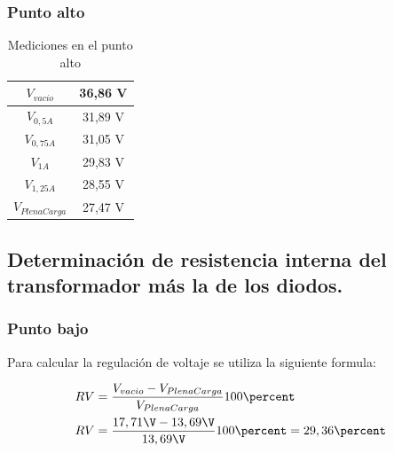 \subsubsection{Punto alto}

\begin{table}[H]
  \centering
  \begin{tabular}{|c|c|}
    \hline
    $V_{vacio}$ & 36,86 V \\ \hline
    $V_{0,5 A}$ & 31,89 V \\ \hline
    $V_{0,75 A}$ & 31,05 V \\ \hline    
    $V_{1 A}$ & 29,83 V \\ \hline
    $V_{1,25 A}$ & 28,55 V \\ \hline
    $V_{PlenaCarga}$ & 27,47 V \\ \hline
  \end{tabular}
  \caption{Mediciones en el punto alto}
\end{table}

\begin{figure}[H]
  \centering
\end{figure}

\subsection{Determinación de resistencia interna del transformador más la de los diodos.}

\subsubsection{Punto bajo}

Para calcular la regulación de voltaje se utiliza la siguiente formula:

\begin{equation}
  \begin{aligned}
    RV &= \dfrac{V_{vacio} - V_{PlenaCarga}}{V_{PlenaCarga}} 100\percent \\
    RV &= \dfrac{17,71\V - 13,69\V}{13,69\V} 100\percent = 29,36\percent
  \end{aligned}
\end{equation}

